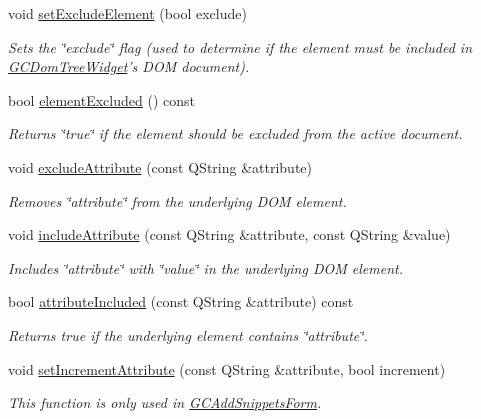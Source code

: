 \begin{DoxyCompactItemize}
void \hyperlink{class_g_c_tree_widget_item_a4c1932884c3e7c0da8be9e2582e02f41}{set\-Exclude\-Element} (bool exclude)
\begin{DoxyCompactList}\small\item\em \-Sets the \char`\"{}exclude\char`\"{} flag (used to determine if the element must be included in \hyperlink{class_g_c_dom_tree_widget}{\-G\-C\-Dom\-Tree\-Widget}'s \-D\-O\-M document). \end{DoxyCompactList}\item 
bool \hyperlink{class_g_c_tree_widget_item_a9ea36ae7110324b227abea2036063b96}{element\-Excluded} () const 
\begin{DoxyCompactList}\small\item\em \-Returns \char`\"{}true\char`\"{} if the element should be excluded from the active document. \end{DoxyCompactList}\item 
void \hyperlink{class_g_c_tree_widget_item_a76e60292eec635fd2e6df27a3e162e16}{exclude\-Attribute} (const \-Q\-String \&attribute)
\begin{DoxyCompactList}\small\item\em \-Removes \char`\"{}attribute\char`\"{} from the underlying \-D\-O\-M element. \end{DoxyCompactList}\item 
void \hyperlink{class_g_c_tree_widget_item_a3f1c09758031e2a8fc1ac9336697b3d9}{include\-Attribute} (const \-Q\-String \&attribute, const \-Q\-String \&value)
\begin{DoxyCompactList}\small\item\em \-Includes \char`\"{}attribute\char`\"{} with \char`\"{}value\char`\"{} in the underlying \-D\-O\-M element. \end{DoxyCompactList}\item 
bool \hyperlink{class_g_c_tree_widget_item_a91d71330acb400242d45b6d74c7e0f87}{attribute\-Included} (const \-Q\-String \&attribute) const 
\begin{DoxyCompactList}\small\item\em \-Returns true if the underlying element contains \char`\"{}attribute\char`\"{}. \end{DoxyCompactList}\item 
void \hyperlink{class_g_c_tree_widget_item_abf57de97998e38563dc9020cdf4d8340}{set\-Increment\-Attribute} (const \-Q\-String \&attribute, bool increment)
\begin{DoxyCompactList}\small\item\em \-This function is only used in \hyperlink{class_g_c_add_snippets_form}{\-G\-C\-Add\-Snippets\-Form}. \end{DoxyCompactList}\item 

\end{DoxyCompactItemize}
